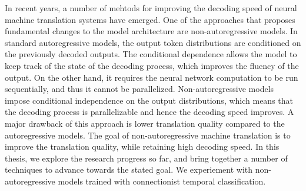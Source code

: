 In recent years, a number of mehtods for improving the decoding speed of neural
machine translation systems have emerged.
%
One of the approaches that proposes fundamental changes to the model
architecture are non-autoregressive models.
%
In standard autoregressive models, the output token distributions are
conditioned on the previously decoded outputs.
%
The conditional dependence allows the model to keep track of the state of the
decoding process, which improves the fluency of the output.
%
On the other hand, it requires the neural network computation to be run
sequentially, and thus it cannot be parallelized.
%
Non-autoregressive models impose conditional independence on the output
distributions, which means that the decoding process is parallelizable and
hence the decoding speed improves.
%
A major drawback of this approach is lower translation quality compared to the
autoregressive models.
%
The goal of non-autoregressive machine translation is to improve the
translation quality, while retaining high decoding speed.
%
In this thesis, we explore the research progress so far, and bring together a
number of techniques to advance towards the stated goal.
%
We experiement with non-autoregressive models trained with connectionist
temporal classification.
%




